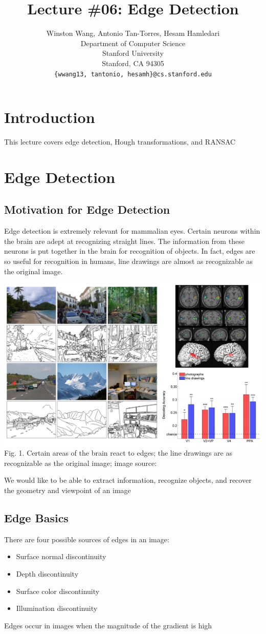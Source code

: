 \documentclass{article}
\title{Lecture \#06: Edge Detection}
\author{
  Winston Wang, Antonio Tan-Torres, Hesam Hamledari \\
  Department of Computer Science\\
  Stanford University\\
  Stanford, CA 94305 \\
  \texttt{\{wwang13, tantonio, hesamh\}@cs.stanford.edu} \\
}
\begin{document}
\maketitle
\section{Introduction}
This lecture covers edge detection, Hough transformations, and RANSAC

\section{Edge Detection}
\subsection{Motivation for Edge Detection}
Edge detection is extremely relevant for mammalian eyes.  Certain neurons within the brain are adept at recognizing straight lines.  The information from these neurons is put together in the brain for recognition of objects.  In fact, edges are so useful for recognition in humans, line drawings are almost as recognizable as the original image.

\includegraphics[width=\textwidth]{line_drawings.png}
Fig. 1. Certain areas of the brain react to edges; the line drawings are as recognizable as the original image; image source: \cite{line_drawings}

We would like to be able to extract information, recognize objects, and recover the geometry and viewpoint of an image
\subsection{Edge Basics}
There are four possible sources of edges in an image:
\begin{itemize}
  \item Surface normal discontinuity
  \item Depth discontinuity
  \item Surface color discontinuity
  \item Illumination discontinuity
\end{itemize}
Edges occur in images when the magnitude of the gradient is high
\end{document}
